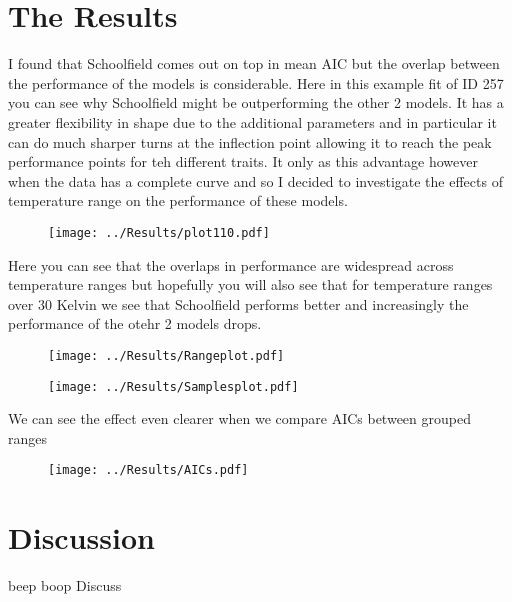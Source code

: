 \documentclass[12pt]{article}
\begin{document}
  \section{The Results}
  I found that Schoolfield comes out on top in mean AIC but the overlap between the performance of the models is considerable. Here in this example fit of ID 257 you can see why Schoolfield might be outperforming the other 2 models. It has a greater flexibility in shape due to the additional parameters and in particular it can do much sharper turns at the inflection point allowing it to reach the peak performance points for teh different traits. It only as this advantage however when the data has a complete curve and so I decided to investigate the effects of temperature range on the performance of these models.\\
  \begin{figure}[h]
    \texttt{[image: ../Results/plot110.pdf]}
  \end{figure}

  Here you can see that the overlaps in performance are widespread across temperature ranges but hopefully you will also see that for temperature ranges over 30 Kelvin we see that Schoolfield performs better and increasingly the performance of the otehr 2 models drops.\\

  \begin{figure}[]
    \texttt{[image: ../Results/Rangeplot.pdf]}
  \end{figure}

  \begin{figure}[]
    \texttt{[image: ../Results/Samplesplot.pdf]}
  \end{figure}

  We can see the effect even clearer when we compare AICs between grouped ranges\: \\

  \begin{figure}[]
    \texttt{[image: ../Results/AICs.pdf]}
  \end{figure}

  \section{Discussion}
  beep boop Discuss\\

  
  
\end{document}
